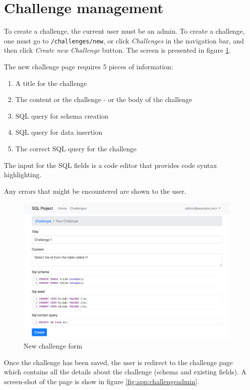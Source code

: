 \section{Challenge management}
To create a challenge, the current user must be an admin. To create a challenge, one must go to \texttt{/challenges/new}, or click \textit{Challenges} in the navigation bar, and then click \textit{Create new Challenge} button. The screen is presented in figure \ref{fig:app:new_challenge}.

The new challenge page requires 5 pieces of information:
\begin{enumerate}
    \item A title for the challenge
    \item The content or the challenge - or the body of the challenge
    \item SQL query for schema creation
    \item SQL query for data insertion
    \item The correct SQL query for the challenge
\end{enumerate}

The input for the SQL fields is a code editor that provides code syntax highlighting.

Any errors that might be encountered are shown to the user.
\begin{figure}[ht]
    \centering
    \includegraphics[width=\textwidth/4*3]{Appendices/new_challenge.png}
    \caption{New challenge form}
    \label{fig:app:new_challenge}
\end{figure}

Once the challenge has been saved, the user is redirect to the challenge page which contains all the details about the challenge (schema and existing fields). A screen-shot of the page is show in figure \ref{fig:app:challengeadmin}.

